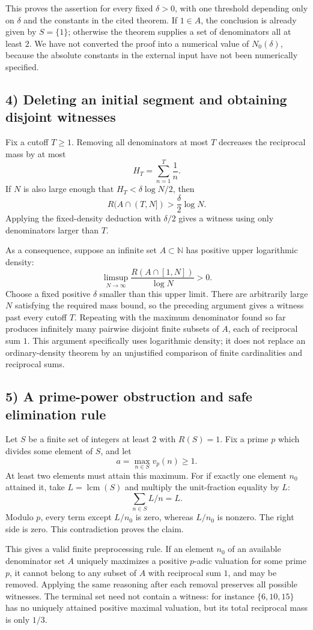 This proves the assertion for every fixed $\delta>0$, with one
threshold depending only on $\delta$ and the constants in the cited
theorem. If $1\in A$, the conclusion is already given by $S=\{1\}$;
otherwise the theorem supplies a set of denominators all at least $2$.
We have not converted the proof into a numerical value of $N_0(\delta)$,
because the absolute constants in the external input have not been
numerically specified.

\subsection{4) Deleting an initial segment and obtaining disjoint witnesses}
Fix a cutoff $T\geq1$. Removing all denominators at most $T$ decreases
the reciprocal mass by at most
\[
 H_T=\sum_{n=1}^T\frac1n.
\]
If $N$ is also large enough that $H_T<\delta\log N/2$, then
\[
 R(A\cap(T,N])>\frac\delta2\log N.
\]
Applying the fixed-density deduction with $\delta/2$ gives a witness
using only denominators larger than $T$.

As a consequence, suppose an infinite set $A\subset\mathbb N$ has
positive upper logarithmic density:
\[
 \limsup_{N\to\infty}\frac{R(A\cap[1,N])}{\log N}>0.
\]
Choose a fixed positive $\delta$ smaller than this upper limit.
There are arbitrarily large $N$ satisfying the required mass bound,
so the preceding argument gives a witness past every cutoff $T$.
Repeating with the maximum denominator found so far produces
infinitely many pairwise disjoint finite subsets of $A$, each of
reciprocal sum $1$. This argument specifically uses logarithmic
density; it does not replace an ordinary-density theorem by an
unjustified comparison of finite cardinalities and reciprocal sums.

\subsection{5) A prime-power obstruction and safe elimination rule}
Let $S$ be a finite set of integers at least $2$ with $R(S)=1$.
Fix a prime $p$ which divides some element of $S$, and let
\[
 a=\max_{n\in S}v_p(n)\geq1.
\]
At least two elements must attain this maximum. For if exactly one
element $n_0$ attained it, take $L=\operatorname{lcm}(S)$ and multiply
the unit-fraction equality by $L$:
\[
 \sum_{n\in S}L/n=L.
\]
Modulo $p$, every term except $L/n_0$ is zero, whereas $L/n_0$ is
nonzero. The right side is zero. This contradiction proves the claim.

This gives a valid finite preprocessing rule. If an element $n_0$ of
an available denominator set $A$ uniquely maximizes a positive
$p$-adic valuation for some prime $p$, it cannot belong to any subset
of $A$ with reciprocal sum $1$, and may be removed. Applying the
same reasoning after each removal preserves all possible witnesses.
The terminal set need not contain a witness: for instance
$\{6,10,15\}$ has no uniquely attained positive maximal valuation,
but its total reciprocal mass is only $1/3$.

